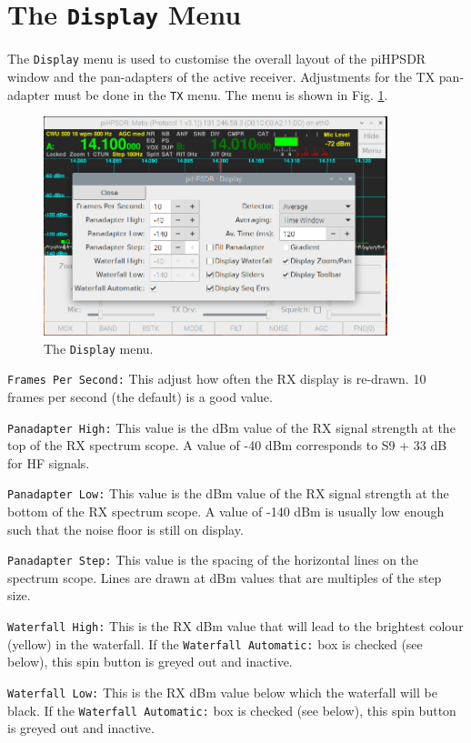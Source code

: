 \documentclass[12pt]{book}
\def\rett#1{\texttt{\color{red}#1}}
\def\bltt#1{\texttt{\color{blue}#1}}
\def\pH{pi\-HPSDR\xspace}
\begin{document}
\section{The \texttt{Display} Menu}

The \bltt{Display} menu is used to customise the overall layout of the \pH
window and the pan-adapters of the active receiver. Adjustments
for the TX pan-adapter must be done in the \bltt{TX} menu. The menu is shown
in Fig. \ref{fig:DisplayMenu}.

\begin{figure}[ht]
\center
\includegraphics[width=10cm]{DisplayMenu.png}
\caption{The \bltt{Display} menu.}
\label{fig:DisplayMenu}
\end{figure}

\rett{Frames Per Second:} This adjust how often the RX display is re-drawn.
10 frames per second (the default) is a good value.

\rett{Panadapter High:} This value is the dBm value of the RX signal strength at the
top of the RX spectrum scope. A value of -40 dBm corresponds to S9 + 33 dB for HF
signals.

\rett{Panadapter Low:} This value is the dBm value of the RX signal strength at the
bottom of the RX spectrum scope. A value of -140 dBm is usually low enough such that
the noise floor is still on display.

\rett{Panadapter Step:} This value is the spacing of the horizontal lines on
the spectrum scope. Lines are drawn at dBm values that are multiples of the step
size.

\rett{Waterfall High:} This is the RX dBm value that will lead to the brightest
colour (yellow) in the waterfall. If the \rett{Waterfall Automatic:} box is checked
(see below), this spin button is greyed out and inactive.

\rett{Waterfall Low:} This is the RX dBm value below which the waterfall will be black.
If the \rett{Waterfall Automatic:} box is checked
(see below), this spin button is greyed out and inactive.
\end{document}
